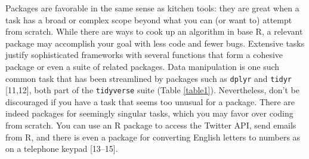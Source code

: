 \documentclass[10pt,letterpaper]{article}
\begin{document}
Packages are favorable in the same sense as kitchen tools: they are
great when a task has a broad or complex scope beyond what you can (or
want to) attempt from scratch. While there are ways to cook up an
algorithm in base R, a relevant package may accomplish your goal with
less code and fewer bugs. Extensive tasks justify sophisticated
frameworks with several functions that form a cohesive package or even a
suite of related packages. Data manipulation is one such common task
that has been streamlined by packages such as \texttt{dplyr} and
\texttt{tidyr} {[}11,12{]}, both part of the \texttt{tidyverse} suite
(Table \ref{table1}). Nevertheless, don't be discouraged if you have a
task that seems too unusual for a package. There are indeed packages for
seemingly singular tasks, which you may favor over coding from scratch.
You can use an R package to access the Twitter API, send emails from R,
and there is even a package for converting English letters to numbers as
on a telephone keypad {[}13--15{]}.
\end{document}
